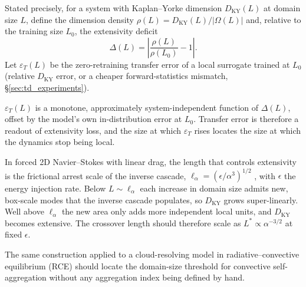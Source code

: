 \documentclass[11pt]{article}
\begin{document}
Stated precisely, for a system with Kaplan--Yorke dimension
$D_{\mathrm{KY}}(L)$ at domain size $L$, define the dimension density
$\rho(L)=D_{\mathrm{KY}}(L)/|\Omega(L)|$ and, relative to the training
size $L_0$, the extensivity deficit
\[
\Delta(L) = \left|\frac{\rho(L)}{\rho(L_0)} - 1\right| .
\]
Let $\varepsilon_T(L)$ be the zero-retraining transfer error of a local
surrogate trained at $L_0$ (relative $D_{\mathrm{KY}}$ error, or a
cheaper forward-statistics mismatch, \S\ref{sec:td_experiments}).

\begin{description}[style=nextline,leftmargin=1.2em]
\item[TD1 (diagnostic hypothesis).] $\varepsilon_T(L)$ is a monotone,
  approximately system-independent function of $\Delta(L)$, offset by the
  model's own in-distribution error at $L_0$. Transfer error is therefore
  a readout of extensivity loss, and the size at which $\varepsilon_T$
  rises locates the size at which the dynamics stop being local.
\item[TD2 (physical mechanism, 2D turbulence).] In forced 2D
  Navier--Stokes with linear drag, the length that controls extensivity
  is the frictional arrest scale of the inverse cascade,
  $\ell_\alpha=(\epsilon/\alpha^3)^{1/2}$ \cite{boffettaecke2012,danilovgurarie2000},
  with $\epsilon$ the energy injection rate. Below
  $L\sim\ell_\alpha$ each increase in domain size admits new, box-scale
  modes that the inverse cascade populates, so $D_{\mathrm{KY}}$ grows
  super-linearly. Well above $\ell_\alpha$ the new area only adds more
  independent local units, and $D_{\mathrm{KY}}$ becomes extensive. The
  crossover length should therefore scale as $L^*\propto\alpha^{-3/2}$
  at fixed $\epsilon$.
\item[TD3 (application).] The same construction applied to a
  cloud-resolving model in radiative--convective equilibrium (RCE) should
  locate the domain-size threshold for convective self-aggregation
  \cite{mullerheld2012,wing2017review} without any aggregation index
  being defined by hand.
\end{description}
\end{document}

